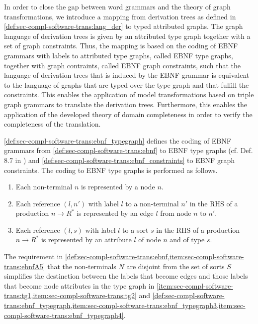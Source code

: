 In order to close the gap between word grammars and the theory of graph transformations, we introduce a mapping from derivation trees as defined in \cref{def:sec-compl-software-trans:lang_der} to typed attributed graphs.
The graph language of derivation trees is given by an attributed type graph together with a set of graph constraints.
Thus, the mapping is based on the coding of EBNF grammars with labels to attributed type graphs, called EBNF type graphs, together with graph contraints, called EBNF graph constraints, such that the language of derivation trees that is induced by the EBNF grammar is equivalent to the language of graphs that are typed over the type graph and that fulfill the constraints.
This enables the application of model transformations based on triple graph grammars to translate the derivation trees.
Furthermore, this enables the application of the developed theory of domain completeness in order to verify the completeness of the translation.

\cref{def:sec-compl-software-trans:ebnf_typegraph} defines the coding of EBNF grammars from \cref{def:sec-compl-software-trans:ebnf} to EBNF type graphs (cf. Def. 8.7 in \cite{Ehrig:2006:FAG:1121741}) and \cref{def:sec-compl-software-trans:ebnf_constraints} to EBNF graph constraints.
The coding to EBNF type graphs is performed as follows.

\begin{enumerate}
  \item Each non-terminal $n$ is represented by a node $n$.
  \item \label{item:sec-compl-software-trans:tg1}Each reference $(l,n')$ with label $l$ to a non-terminal $n'$ in the RHS of a production $n \to R^*$ is represented by an edge $l$ from node $n$ to $n'$.
  \item \label{item:sec-compl-software-trans:tg2}Each reference $(l,s)$ with label $l$ to a sort $s$ in the RHS of a production $n \to R^*$ is represented by an attribute $l$ of node $n$ and of type $s$.
\end{enumerate}

The requirement in \cref{def:sec-compl-software-trans:ebnf,item:sec-compl-software-trans:ebnfA5} that the non-terminals $N$ are disjoint from the set of sorts $S$ simplifies the destinction between the labels that become edges and those labels that become node attributes in the type graph in \cref{item:sec-compl-software-trans:tg1,item:sec-compl-software-trans:tg2} and \cref{def:sec-compl-software-trans:ebnf_typegraph,item:sec-compl-software-trans:ebnf_typegraph3,item:sec-compl-software-trans:ebnf_typegraph4}.

